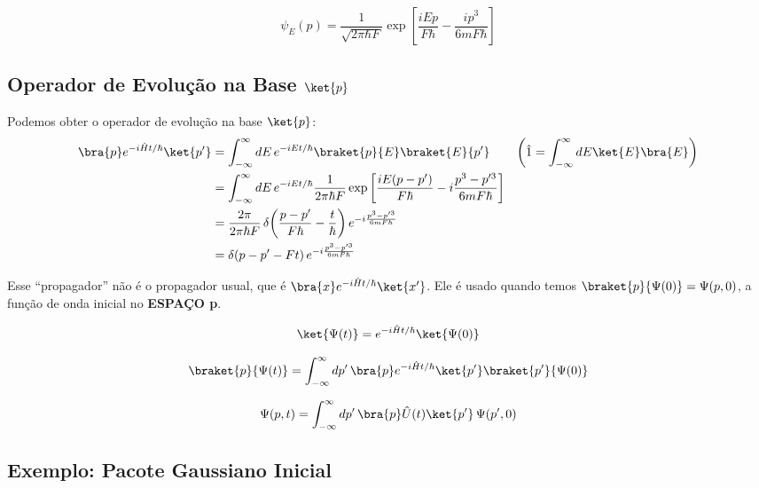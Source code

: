 \begin{equation}
    \boxed{\psi_E(p) = \frac{1}{\sqrt{2\pi\hbar F}} \exp\left[ \frac{iEp}{F\hbar} - \frac{ip^3}{6mF\hbar} \right]}
\label{eq:aula17_psiE_normalizada}
\end{equation}

\subsection*{Operador de Evolução na Base $\ket{p}$}

Podemos obter o operador de evolução na base $\ket{p}$:
\begin{align}
    \bra{p} e^{-i\hat{H}t/\hbar} \ket{p'} &= \int_{-\infty}^{\infty} dE\, e^{-iEt/\hbar} \braket{p}{E}\braket{E}{p'} \qquad \left( \hat{1} = \int_{-\infty}^{\infty} dE \ket{E}\bra{E} \right) \notag \\
    &= \int_{-\infty}^{\infty} dE\, e^{-iEt/\hbar} \frac{1}{2\pi\hbar F} \exp\left[ \frac{iE(p-p')}{F\hbar} - i\frac{p^3 - p'^3}{6mF\hbar} \right] \notag \\
    &= \frac{2\pi}{2\pi\hbar F}\, \delta\!\left( \frac{p-p'}{F\hbar} - \frac{t}{\hbar} \right) e^{-i\frac{p^3-p'^3}{6mF\hbar}} \notag \\
    &= \delta(p - p' - Ft)\, e^{-i\frac{p^3-p'^3}{6mF\hbar}}
\label{eq:aula17_operador_evolucao_p}
\end{align}

Esse ``propagador'' não é o propagador usual, que é $\bra{x} e^{-i\hat{H}t/\hbar} \ket{x'}$. Ele é usado quando temos $\braket{p}{\Psi(0)} = \Psi(p,0)$, a função de onda inicial no \textbf{ESPAÇO p}.

\begin{equation}
    \ket{\Psi(t)} = e^{-i\hat{H}t/\hbar} \ket{\Psi(0)}
\label{eq:aula17_evolucao_ket}
\end{equation}

\begin{equation}
    \braket{p}{\Psi(t)} = \int_{-\infty}^{\infty} dp'\, \bra{p} e^{-i\hat{H}t/\hbar} \ket{p'} \braket{p'}{\Psi(0)}
\label{eq:aula17_psi_t_p}
\end{equation}

\begin{equation}
    \Psi(p,t) = \int_{-\infty}^{\infty} dp'\, \bra{p} \hat{U}(t) \ket{p'}\, \Psi(p',0)
\label{eq:aula17_psi_t_p_U}
\end{equation}

\subsection*{Exemplo: Pacote Gaussiano Inicial}

